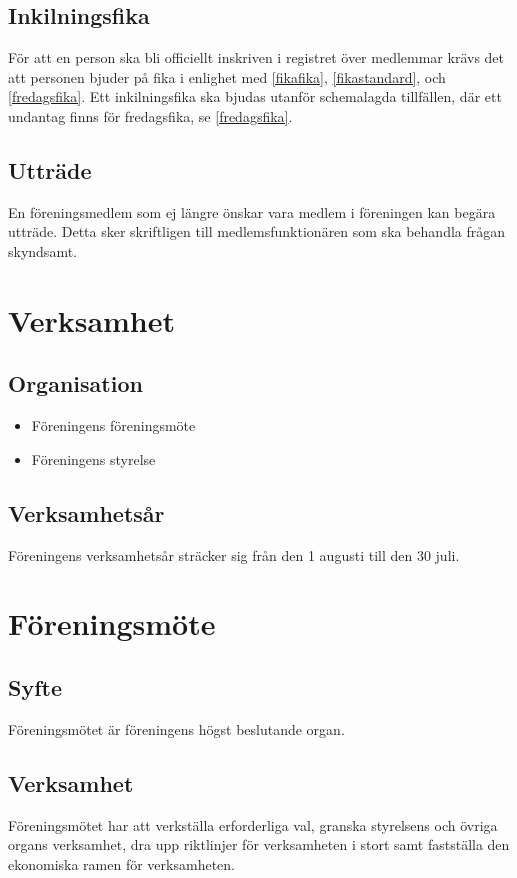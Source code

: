 \documentclass{article}
\begin{document}
\subsection{Inkilningsfika}
För att en person ska bli officiellt inskriven i registret över medlemmar krävs
det att personen bjuder på fika i enlighet med \ref{fikafika},
\ref{fikastandard}, och \ref{fredagsfika}. Ett inkilningsfika ska bjudas utanför
schemalagda tillfällen, där ett undantag finns för fredagsfika, se
\ref{fredagsfika}.

\subsection{Utträde}
En föreningsmedlem som ej längre önskar vara medlem i föreningen kan begära
utträde. Detta sker skriftligen till medlemsfunktionären som ska behandla
frågan skyndsamt.

\section{Verksamhet}
\subsection{Organisation}
\begin{itemize}
  \item Föreningens föreningsmöte
  \item Föreningens styrelse
\end{itemize}
\subsection{Verksamhetsår}
Föreningens verksamhetsår sträcker sig från den 1 augusti till den 30 juli.

\section{Föreningsmöte}
\subsection{Syfte}
Föreningsmötet är föreningens högst beslutande organ.
\subsection{Verksamhet}
Föreningsmötet har att verkställa erforderliga val, granska styrelsens och övriga
organs verksamhet, dra upp riktlinjer för verksamheten i stort samt fastställa
den ekonomiska ramen för verksamheten.
\end{document}
